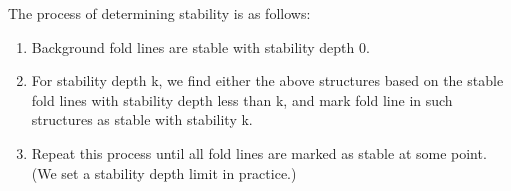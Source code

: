 The process of determining stability is as follows:
\begin{enumerate}
\item Background fold lines are stable with stability depth 0.
\item For stability depth k, we find either the above structures based on the stable fold lines with stability depth less than k, and mark fold line in such structures as stable with stability k.
\item Repeat this process until all fold lines are marked as stable at some point. (We set a stability depth limit in practice.)
\end{enumerate}